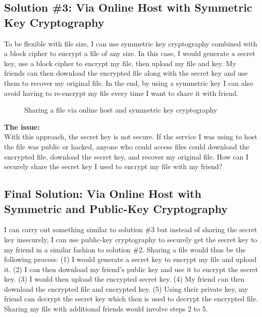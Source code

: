 \documentclass{article}
\begin{document}
\subsection*{Solution \#3: Via Online Host with Symmetric Key Cryptography}
To be flexible with file size, I can use symmetric key cryptography combined with a block cipher to encrypt a file of any size. In this case, I would generate a secret key, use a block cipher to encrypt my file, then upload my file and key. My friends can then download the encrypted file along with the secret key and use them to recover my original file. In the end, by using a symmetric key I can also avoid having to re-encrypt my file every time I want to share it with friend. \\


\begin{figure}[!htb]
        \caption{Sharing a file via online host and symmetric key cryptography}
\end{figure}


\noindent \textbf{The issue:}\\
With this approach, the secret key is not secure. If the service I was using to host the file was public or hacked, anyone who could access files could download the encrypted file, download the secret key, and recover my original file. How can I securely share the secret key I used to encrypt my file with my friend?


\subsection*{Final Solution: Via Online Host with Symmetric and Public-Key Cryptography}
I can carry out something similar to solution \#3 but instead of sharing the secret key insecurely, I can use public-key cryptography to securely get the secret key to my friend in a similar fashion to solution \#2. Sharing a file would thus be the following process: (1) I would generate a secret key to encrypt my file and upload it. (2) I can then download my friend's public key and use it to encrypt the secret key. (3) I would then upload the encrypted secret key. (4) My friend can then download the encrypted file and encrypted key. (5) Using their private key, my friend can decrypt the secret key which then is used to decrypt the encrypted file. Sharing my file with additional friends would involve steps 2 to 5. 
\end{document}
